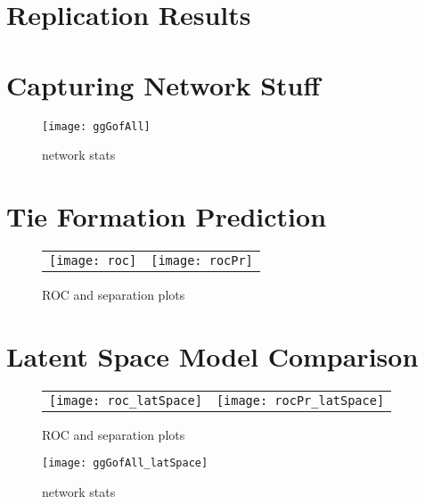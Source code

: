 

\section{Replication Results}



\section{Capturing Network Stuff}

\begin{figure}[ht]
	\centering
	\texttt{[image: ggGofAll]}
	\caption{network stats }
	\label{fig:gofAll}
\end{figure}

\section{Tie Formation Prediction}



\begin{figure}[ht]
	\centering
	\begin{tabular}{cc}
	\texttt{[image: roc]} & 
	\texttt{[image: rocPr]}	
	\end{tabular}
	\caption{ROC and separation plots}
	\label{fig:roc}
\end{figure}


\section{Latent Space Model Comparison}





\begin{figure}[ht]
	\centering
	\begin{tabular}{cc}
	\texttt{[image: roc\_latSpace]} & 
	\texttt{[image: rocPr\_latSpace]}
	\end{tabular}
	\caption{ROC and separation plots}
	\label{fig:roc_latentSpace}
\end{figure}

\begin{figure}[ht]
	\centering
	\texttt{[image: ggGofAll\_latSpace]}
	\caption{network stats }
	\label{fig:gofAll_latSpace}
\end{figure}

